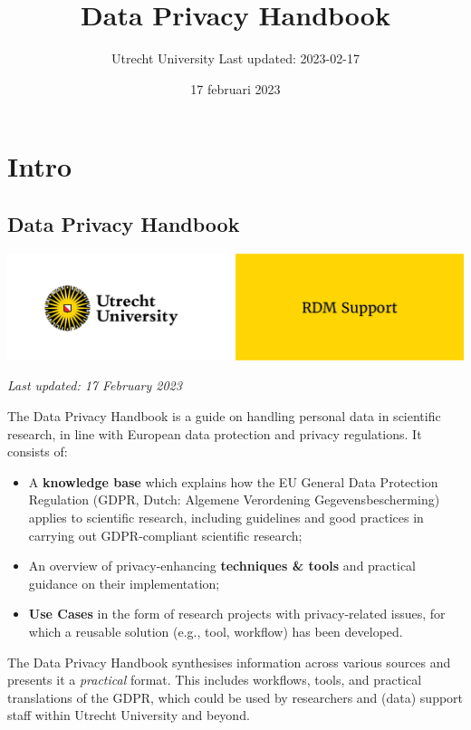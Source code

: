 \documentclass[
]{book}
\title{Data Privacy Handbook}
\author{Utrecht University \textbar{} Last updated: 2023-02-17}
\date{17 februari 2023}
\providecommand{\tightlist}{%
  \setlength{\itemsep}{0pt}\setlength{\parskip}{0pt}}
\begin{document}
\maketitle

{
\setcounter{tocdepth}{1}
\tableofcontents
}
\hypertarget{part-intro}{%
\part*{Intro}\label{part-intro}}

\hypertarget{data-privacy-handbook}{%
\chapter*{Data Privacy Handbook}\label{data-privacy-handbook}}

\includegraphics{img/cover-image-dph.png}

\emph{Last updated: 17 February 2023}

The Data Privacy Handbook is a guide on handling personal data in scientific
research, in line with European data protection and privacy regulations. It
consists of:

\begin{itemize}
\tightlist
\item
  A \textbf{knowledge base} which explains how the EU General Data Protection
  Regulation (GDPR, Dutch: Algemene Verordening Gegevensbescherming) applies to
  scientific research, including guidelines and good practices in carrying out
  GDPR-compliant scientific research;
\item
  An overview of privacy-enhancing \textbf{techniques \& tools} and practical guidance
  on their implementation;
\item
  \textbf{Use Cases} in the form of research projects with privacy-related issues,
  for which a reusable solution (e.g., tool, workflow) has been developed.
\end{itemize}

The Data Privacy Handbook synthesises information across various sources and
presents it a \emph{practical} format. This includes workflows, tools, and practical
translations of the GDPR, which could be used by researchers and (data) support
staff within Utrecht University and beyond.
\end{document}
